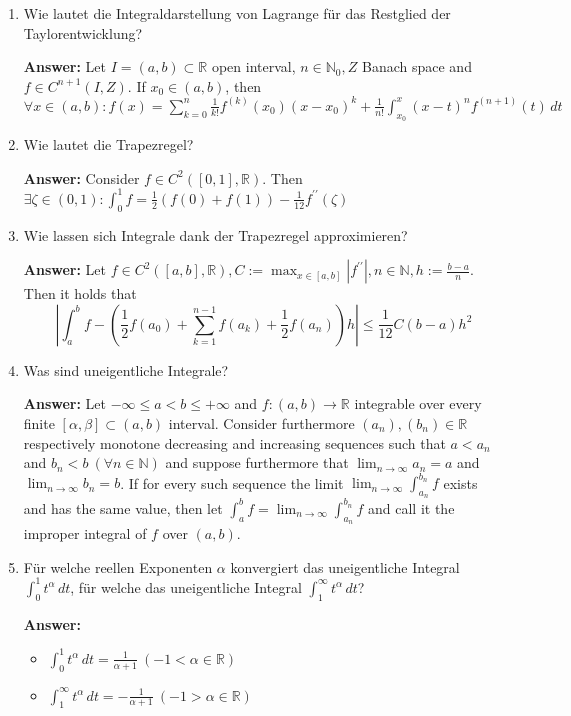 \documentclass[11pt]{article}
\newcommand{\abs}[1]{\left|#1\right|}
\newcommand{\RR}[0]{\mathbb{R}}
\newcommand{\NN}[0]{\mathbb{N}}
\begin{document}
\begin{enumerate}
    \item Wie lautet die Integraldarstellung von Lagrange für das Restglied der Taylorentwicklung?

    \textbf{Answer:} Let $I = (a, b) \subset \RR$ open interval, $n \in \NN_0, Z$ Banach space and $f \in C^{n+1}(I, Z)$. If $x_0 \in (a, b)$, then $\forall x \in (a, b)\colon f(x) = \sum_{k=0}^n \frac{1}{k!}f^{(k)}(x_0) (x - x_0)^k + \frac{1}{n!} \int_{x_0}^x (x-t)^n f^{(n+1)}(t)\,dt$
    \item Wie lautet die Trapezregel?

    \textbf{Answer:} Consider $f \in C^2([0, 1], \mathbb{R})$. Then $\exists \zeta \in (0, 1)\colon \int_0^1 f = \frac{1}{2}(f(0) + f(1))- \frac{1}{12}f^{\prime\prime}(\zeta)$

    \item Wie lassen sich Integrale dank der Trapezregel approximieren?

    \textbf{Answer:} Let $f \in C^2([a, b], \RR), C := \max_{x\in[a, b]}\abs{f^{\prime\prime}}, n \in \NN, h := \frac{b-a}{n}$. Then it holds that $$\abs{\int_a^b f - \left(\frac{1}{2}f(a_0) + \sum_{k=1}^{n-1}f(a_k) + \frac{1}{2}f(a_n)\right)h}\le \frac{1}{12}C(b-a)h^2$$
    \item Was sind uneigentliche Integrale?

    \textbf{Answer:} Let $-\infty \le a < b \le +\infty$ and $f\colon(a, b) \to \RR$ integrable over every finite $[\alpha, \beta] \subset (a, b)$ interval. Consider furthermore $(a_n), (b_n) \in \RR$ respectively monotone decreasing and increasing sequences such that $a < a_n$ and $b_n < b~(\forall n \in \NN)$ and suppose furthermore that $\lim_{n\to\infty}a_n = a$ and $\lim_{n\to\infty}b_n = b$. If for every such sequence the limit $\lim_{n\to\infty}\int_{a_n}^{b_n} f$ exists and has the same value, then let $\int_a^b f = \lim_{n\to\infty}\int_{a_n}^{b_n} f$ and call it the improper integral of $f$ over $(a, b)$.

    \item Für welche reellen Exponenten $\alpha$ konvergiert das uneigentliche Integral $\int_0^1t^\alpha\,dt$, für welche das uneigentliche Integral $\int_1^\infty t^\alpha \,dt$?

    \textbf{Answer:}
    \begin{itemize}
        \item $\int_0^1t^\alpha\,dt = \frac{1}{\alpha+1}~(-1 < \alpha \in \RR)$
        \item $\int_1^\infty t^\alpha \,dt = -\frac{1}{\alpha+1}~(-1 > \alpha \in \RR)$
    \end{itemize}


\end{enumerate}
\end{document}
